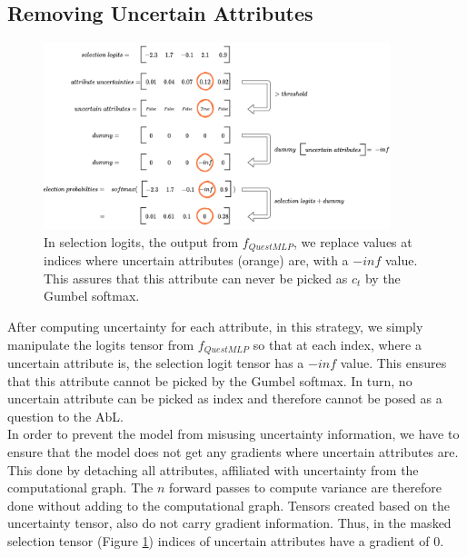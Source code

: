 \documentclass[a4paper,cleardoubleempty,BCOR1cm, 11pt]{report}
\begin{document}
\subsection{Removing Uncertain Attributes}\label{sec:remRDTC}
\begin{figure}
	\centering
	\includegraphics[width=0.9\textwidth]{images/remove_attrs.pdf} 
	\caption{In selection logits, the output from $f_{QuestMLP}$, we replace values at indices where uncertain attributes (orange) are, with a $-inf$ value. This assures that this attribute can never be picked as $c_t$ by the Gumbel softmax.}
	\label{fig:remove_intuition}
\end{figure}

After computing uncertainty for each attribute, in this strategy, we simply manipulate the logits tensor from $f_{QuestMLP}$ so that at each index, where a uncertain attribute is, the selection logit tensor has a $-inf$ value. This ensures that this attribute cannot be picked by the Gumbel softmax. In turn, no uncertain attribute can be picked as index and therefore cannot be posed as a question to the AbL.\\
In order to prevent the model from misusing uncertainty information, we have to ensure that the model does not get any gradients where uncertain attributes are. This done by detaching all attributes, affiliated with uncertainty from the computational graph. The $n$ forward passes to compute variance are therefore done without adding to the computational graph. Tensors created based on the uncertainty tensor, also do not carry gradient information. Thus, in the masked selection tensor (Figure \ref{fig:remove_intuition}) indices of uncertain attributes have a gradient of $0$.
\end{document}
